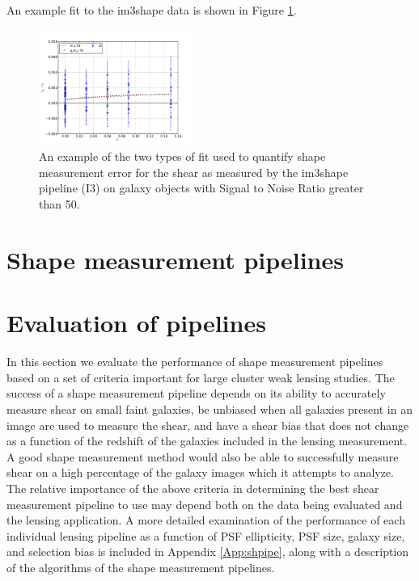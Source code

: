 \documentclass[useAMS,usenatbib]{mn2e}
\begin{document}
An example fit to the im3shape data is shown in Figure \ref{fig:eqfit}.

\begin{figure}
 \centering  %
  \includegraphics[width=0.45\textwidth]{fig/fitplt.pdf} 
  \caption{An example of the two types of fit used to quantify shape
    measurement error for the shear as measured by the im3shape
    pipeline (I3) on galaxy objects with Signal
    to Noise Ratio greater than 50. }
\label{fig:eqfit}
\end{figure}




\section{Shape measurement pipelines}




\section{Evaluation of pipelines}
In this section we evaluate the performance of shape measurement 
pipelines based on a set of criteria important for large cluster weak
lensing studies. The success of a shape measurement pipeline depends
on its ability to accurately measure shear on small faint galaxies, be unbiased
when all galaxies present in an image are used to measure the shear, and
have a shear bias that does not change as a function of the redshift
of the galaxies included in the lensing measurement. A good shape
measurement method would also be able to successfully measure shear on
a high percentage of the galaxy images which it attempts to analyze. 
The relative importance of the above criteria in determining
the best shear measurement pipeline to use may depend both on the 
data being evaluated and the lensing application. A more detailed examination
of the performance of each individual lensing pipeline 
as a function of PSF ellipticity, PSF size, galaxy size, 
and selection bias is included in Appendix \ref{App:shpipe}, along
with a description of the algorithms of the shape measurement pipelines. \\
\end{document}
